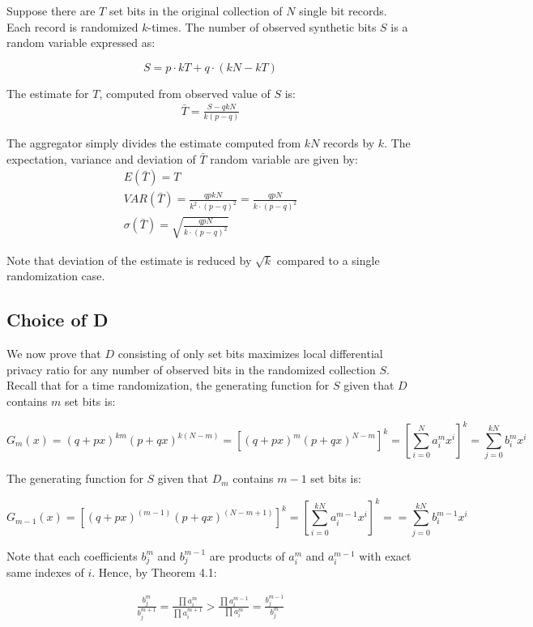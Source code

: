 \documentclass[11pt,draft]{article}
\begin{document}
Suppose there are $T$ set bits in the original collection of $N$ single bit records. Each record is randomized $k$-times.  The number of observed synthetic bits $S$ is a random variable expressed as:

\[ S = p \cdot kT + q \cdot (kN-kT) \]

The estimate for $T$, computed from observed value of $S$ is:
\begin{align}
\bar{T} = \frac{S-qkN}{k(p-q)}
\end{align}

The aggregator simply divides the estimate computed from $kN$ records by $k$.  The expectation, variance and deviation of $\bar{T}$ random variable are given by:
\begin{align}
E(\bar{T}) = T\\
VAR(\bar{T}) = \frac{qpkN}{k^2 \cdot (p-q)^2} = \frac{qpN}{k\cdot (p-q)^2}\\
\sigma(\bar{T}) = \sqrt{\frac{qpN}{k \cdot (p-q)^2}}
\end{align}

Note that deviation of the estimate is reduced by $\sqrt{k}$ compared to a single randomization case.

\subsection{Choice of D}

We now prove that $D$ consisting of only set bits maximizes local differential privacy ratio for any number of observed bits in the randomized collection $S$.  Recall that for a time randomization, the generating function for $S$ given that $D$ contains $m$ set bits is:

\[
G_m(x) = (q + px)^{km} (p + qx)^{k(N-m)} =  [(q + px)^{m} (p + qx)^{N-m}]^k = \left [ \sum_{i=0}^{N} a_i^mx^i \right ]^k =  \sum_{j=0}^{kN} b_i^mx^i
\]

The generating function for $S$ given that $D_m$ contains $m-1$ set bits is:

\[
G_{m-1}(x) = [(q + px)^{(m-1)} (p + qx)^{(N-m+1)}]^k =  \left [  \sum_{i=0}^{kN} a_i^{m-1}x^i \right ]^k = =  \sum_{j=0}^{kN} b_i^{m-1}x^i
\]

Note that each coefficients $b^m_j$ and $b_j^{m-1}$ are products of $a^m_i$ and $a^{m-1}_i$ with exact same indexes of $i$.  Hence, by Theorem 4.1:

\begin{align}
\frac{b_j^m}{b_j^{m+1}}  = \frac{\prod{a_i^m}}{\prod{a_i^{m+1}}}>   \frac{\prod{a_i^{m-1}}}{\prod{a_i^{m}}} = \frac{b_j^{m-1}}{b_j^{m}}
\end{align}
\end{document}
